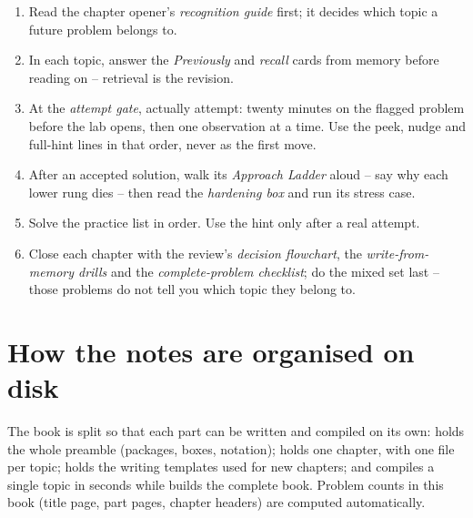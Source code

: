 \begin{enumerate}
  \item Read the chapter opener's \emph{recognition guide} first; it decides
        which topic a future problem belongs to.
  \item In each topic, answer the \emph{Previously} and \emph{recall} cards from
        memory before reading on -- retrieval is the revision.
  \item At the \emph{attempt gate}, actually attempt: twenty minutes on the
        flagged problem before the lab opens, then one observation at a time.
        Use the peek, nudge and full-hint lines in that order, never as the
        first move.
  \item After an accepted solution, walk its \emph{Approach Ladder} aloud --
        say why each lower rung dies -- then read the \emph{hardening box} and
        run its stress case.
  \item Solve the practice list in order. Use the hint only after a real attempt.
  \item Close each chapter with the review's \emph{decision flowchart}, the
        \emph{write-from-memory drills} and the \emph{complete-problem
        checklist}; do the mixed set last -- those problems do not tell you
        which topic they belong to.
\end{enumerate}

\section*{How the notes are organised on disk}

The book is split so that each part can be written and compiled on its own:
 holds the whole preamble (packages, boxes, notation);
 holds one chapter, with one file per topic;
 holds the writing templates used for new chapters; and
 compiles a single topic in seconds while
 builds the complete book. Problem counts in this book
(title page, part pages, chapter headers) are computed automatically.
